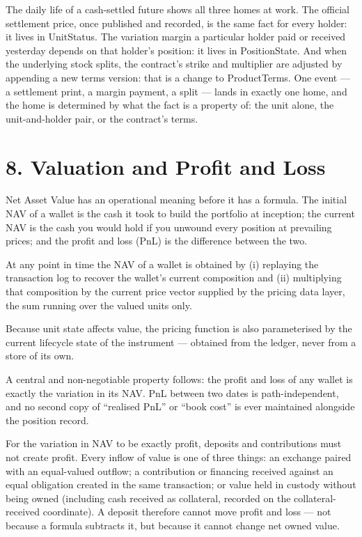 \documentclass[11pt,a4paper]{article}
\begin{document}
The daily life of a cash-settled future shows all three homes at work.
The official settlement price, once published and recorded, is the same
fact for every holder: it lives in UnitStatus. The variation margin a
particular holder paid or received yesterday depends on that holder's
position: it lives in PositionState. And when the underlying stock
splits, the contract's strike and multiplier are adjusted by appending a
new terms version: that is a change to ProductTerms. One event --- a
settlement print, a margin payment, a split --- lands in exactly one
home, and the home is determined by what the fact is a property of: the
unit alone, the unit-and-holder pair, or the contract's terms.

\hypertarget{valuation-and-profit-and-loss}{%
\section{8. Valuation and Profit and
Loss}\label{valuation-and-profit-and-loss}}

Net Asset Value has an operational meaning before it has a formula. The
initial NAV of a wallet is the cash it took to build the portfolio at
inception; the current NAV is the cash you would hold if you unwound
every position at prevailing prices; and the profit and loss (PnL) is
the difference between the two.

At any point in time the NAV of a wallet is obtained by (i) replaying
the transaction log to recover the wallet's current composition and (ii)
multiplying that composition by the current price vector supplied by the
pricing data layer, the sum running over the valued units only.

Because unit state affects value, the pricing function is also
parameterised by the current lifecycle state of the instrument ---
obtained from the ledger, never from a store of its own.

A central and non-negotiable property follows: the profit and loss of
any wallet is exactly the variation in its NAV. PnL between two dates is
path-independent, and no second copy of ``realised PnL'' or ``book
cost'' is ever maintained alongside the position record.

For the variation in NAV to be exactly profit, deposits and
contributions must not create profit. Every inflow of value is one of
three things: an exchange paired with an equal-valued outflow; a
contribution or financing received against an equal obligation created
in the same transaction; or value held in custody without being owned
(including cash received as collateral, recorded on the
collateral-received coordinate). A deposit therefore cannot move profit
and loss --- not because a formula subtracts it, but because it cannot
change net owned value.
\end{document}
